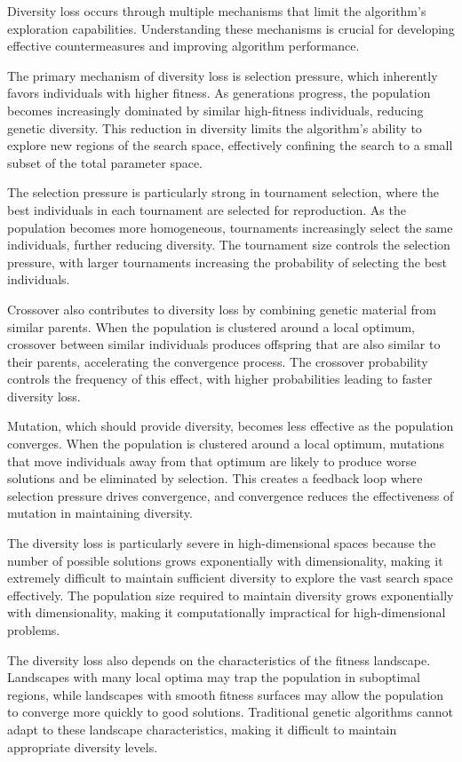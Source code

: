 \documentclass[12pt,a4paper]{article}
\begin{document}
Diversity loss occurs through multiple mechanisms that limit the algorithm's exploration capabilities. Understanding these mechanisms is crucial for developing effective countermeasures and improving algorithm performance.

The primary mechanism of diversity loss is selection pressure, which inherently favors individuals with higher fitness. As generations progress, the population becomes increasingly dominated by similar high-fitness individuals, reducing genetic diversity. This reduction in diversity limits the algorithm's ability to explore new regions of the search space, effectively confining the search to a small subset of the total parameter space.

The selection pressure is particularly strong in tournament selection, where the best individuals in each tournament are selected for reproduction. As the population becomes more homogeneous, tournaments increasingly select the same individuals, further reducing diversity. The tournament size controls the selection pressure, with larger tournaments increasing the probability of selecting the best individuals.

Crossover also contributes to diversity loss by combining genetic material from similar parents. When the population is clustered around a local optimum, crossover between similar individuals produces offspring that are also similar to their parents, accelerating the convergence process. The crossover probability controls the frequency of this effect, with higher probabilities leading to faster diversity loss.

Mutation, which should provide diversity, becomes less effective as the population converges. When the population is clustered around a local optimum, mutations that move individuals away from that optimum are likely to produce worse solutions and be eliminated by selection. This creates a feedback loop where selection pressure drives convergence, and convergence reduces the effectiveness of mutation in maintaining diversity.

The diversity loss is particularly severe in high-dimensional spaces because the number of possible solutions grows exponentially with dimensionality, making it extremely difficult to maintain sufficient diversity to explore the vast search space effectively. The population size required to maintain diversity grows exponentially with dimensionality, making it computationally impractical for high-dimensional problems.

The diversity loss also depends on the characteristics of the fitness landscape. Landscapes with many local optima may trap the population in suboptimal regions, while landscapes with smooth fitness surfaces may allow the population to converge more quickly to good solutions. Traditional genetic algorithms cannot adapt to these landscape characteristics, making it difficult to maintain appropriate diversity levels.
\end{document}
